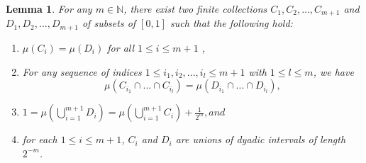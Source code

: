 \documentclass[10pt,a4paper]{amsart}
\newtheorem{lemma}{Lemma}
\begin{document}
\begin{lemma}\label{prelim equality lemma}
    For any $m \in \mathbb{N}$, there exist two finite collections  $C_1,\allowbreak C_2,\allowbreak \dots,\allowbreak C_{m+1}$ and
$D_1,\allowbreak D_2,\allowbreak \dots,\allowbreak D_{m+1}$ of subsets of $[0,1]$ such that the following hold: 
    \begin{enumerate}[label=(\roman*)]
    \item $\mu (C_i) = \mu (D_i) $ for all $1\leq i \leq m+1$ ,
     \item For any sequence of indices $1 \leq i_1,i_2,...,i_l \leq m+1$ with $1 \leq l \leq m$, we have \[\mu(C_{i_1} \cap ... \cap C_{i_l}) = \mu(D_{i_1} \cap ... \cap D_{i_l}),\]

     \item $1=\mu \left( \bigcup_{i=1}^{m+1} D_i \right) = \mu \left( \bigcup_{i=1}^{m+1} C_i \right)+\frac{1}{2^m}, and$     
     \item  for each $1 \leq i \leq m+1$, $C_i$ and $D_i$ are unions of dyadic intervals of length $2^{-m}$.
     \end{enumerate}


\end{lemma}
\end{document}
